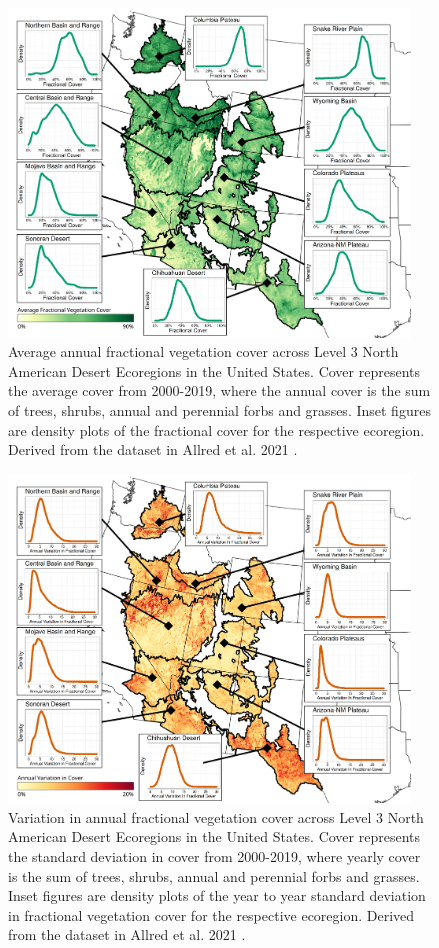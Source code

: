 \documentclass{article}
\begin{document}
\begin{figure}[h]
    \centering
    \includegraphics[width=0.95\textwidth]{figures/fig6_avg_cover.png}
    \caption{Average annual fractional vegetation cover across Level 3 North American Desert Ecoregions in the United States. Cover represents the average cover from 2000-2019, where the annual cover is the sum of trees, shrubs, annual and perennial forbs and grasses. Inset figures are density plots of the fractional cover for the respective ecoregion. Derived from the dataset in Allred et al. 2021 \cite{allred2021}.}
    \label{fig6}
\end{figure}

\begin{figure}[h]
    \centering
    \includegraphics[width=0.95\textwidth]{figures/fig7_std_cover.png}
    \caption{Variation in annual fractional vegetation cover across Level 3 North American Desert Ecoregions in the United States. Cover represents the standard deviation in cover from 2000-2019, where yearly cover is the sum of trees, shrubs, annual and perennial forbs and grasses. Inset figures are density plots of the year to year standard deviation in fractional vegetation cover for the respective ecoregion. Derived from the dataset in Allred et al. 2021 \cite{allred2021}.}
    \label{fig7}
\end{figure}
\end{document}
